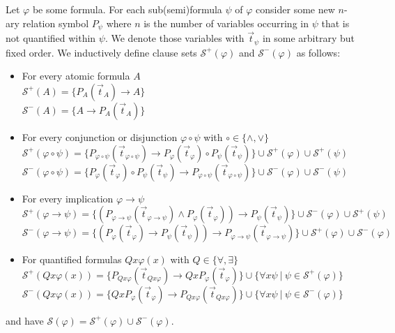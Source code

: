 \documentclass[a4paper,UKenglish,cleveref, autoref, thm-restate]{lipics-v2021}
\begin{document}
\begin{definition}
	Let $\varphi$ be some formula. For each sub(semi)formula $\psi$ of $\varphi$ consider some new $n$-ary relation symbol $P_\psi$ where $n$ is the number of variables occurring in $\psi$ that is not quantified within $\psi$. We denote those variables with $\vec t_\psi$ in some arbitrary but fixed order. We inductively define clause sets $\mathcal S^+(\varphi)$ and $\mathcal S^-(\varphi)$ as follows:
	\begin{itemize}
		\item For every atomic formula $A$\\$\mathcal S^+(A) = \{P_A(\vec t_A)\to A\}$\\$\mathcal S^-(A) = \{A\to P_A(\vec t_A)\}$
		\item For every conjunction or disjunction $\varphi\circ\psi$ with $\circ\in\{\wedge,\vee\}$\\$\mathcal S^+(\varphi\circ\psi) = \{P_{\varphi\circ\psi}(\vec t_{\varphi\circ\psi})\to P_{\varphi}(\vec t_\varphi)\circ P_{\psi}(\vec t_\psi)\}\cup \mathcal S^+(\varphi)\cup \mathcal S^+(\psi)$\\$\mathcal S^-(\varphi\circ\psi) =\{P_{\varphi}(\vec t_\varphi)\circ P_{\psi}(\vec t_\psi)\to P_{\varphi\circ\psi}(\vec t_{\varphi\circ\psi})\}\cup \mathcal S^-(\varphi)\cup \mathcal S^-(\psi)$
		\item For every implication $\varphi \to\psi$\\$\mathcal S^+(\varphi\to\psi) = \{(P_{\varphi\to\psi}(\vec t_{\varphi\to\psi})\wedge P_{\varphi}(\vec t_\varphi))\to P_{\psi}(\vec t_\psi)\}\cup \mathcal S^-(\varphi)\cup \mathcal S^+(\psi)$\\$\mathcal S^-(\varphi\to\psi)  = \{(P_{\varphi}(\vec t_\varphi)\to P_{\psi}(\vec t_\psi))\to P_{\varphi\to\psi}(\vec t_{\varphi\to\psi})\}\cup \mathcal S^+(\varphi)\cup \mathcal S^-(\varphi)$
		\item For quantified formulas $Qx\varphi(x)$ with $Q\in \{\forall,\exists\}$\\$\mathcal S^+(Qx\varphi(x)) = \{P_{Qx\varphi}(\vec t_{Qx\varphi})\to QxP_{\varphi}(\vec t_{\varphi})\}\cup \{\forall x\psi\:|\:\psi\in\mathcal S^+(\varphi)\}$\\$\mathcal S^-(Qx\varphi(x))  = \{QxP_{\varphi}(\vec t_{\varphi})\to P_{Qx\varphi}(\vec t_{Qx\varphi})\}\cup \{\forall x\psi\:|\:\psi\in\mathcal S^-(\varphi)\}$
	\end{itemize}
	and have $\mathcal S(\varphi) = \mathcal S^+(\varphi)\cup\mathcal S^-(\varphi)$.
\end{definition}
\end{document}
